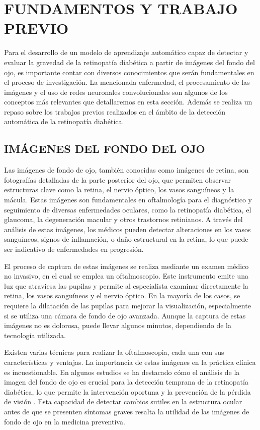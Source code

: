 \chapter{FUNDAMENTOS Y TRABAJO PREVIO}

Para el desarrollo de un modelo de aprendizaje automático capaz de detectar y evaluar la
gravedad de la retinopatía diabética a partir de imágenes del fondo del ojo, es importante
contar con diversos conocimientos que serán fundamentales en el proceso de investigación.
La mencionada enfermedad, el procesamiento de las imágenes y el uso de redes neuronales
convolucionales son algunos de los conceptos más relevantes que detallaremos en esta
sección. Además se realiza un repaso sobre los trabajos previos realizados en el ámbito de
la detección automática de la retinopatía diabética.

\section{IMÁGENES DEL FONDO DEL OJO}

Las imágenes de fondo de ojo, también conocidas como imágenes de retina, son fotografías
detalladas de la parte posterior del ojo, que permiten observar estructuras clave como la
retina, el nervio óptico, los vasos sanguíneos y la mácula. Estas imágenes son
fundamentales en oftalmología para el diagnóstico y seguimiento de diversas enfermedades
oculares, como la retinopatía diabética, el glaucoma, la degeneración macular y otros
trastornos retinianos. A través del análisis de estas imágenes, los médicos pueden
detectar alteraciones en los vasos sanguíneos, signos de inflamación, o daño estructural
en la retina, lo que puede ser indicativo de enfermedades en progresión.

El proceso de captura de estas imágenes se realiza mediante un examen médico no invasivo,
en el cual se emplea un oftalmoscopio. Este instrumento emite una luz que atraviesa las
pupilas y permite al especialista examinar directamente la retina, los vasos sanguíneos y
el nervio óptico. En la mayoría de los casos, se requiere la dilatación de las pupilas
para mejorar la visualización, especialmente si se utiliza una cámara de fondo de ojo
avanzada. Aunque la captura de estas imágenes no es dolorosa, puede llevar algunos
minutos, dependiendo de la tecnología utilizada.

Existen varias técnicas para realizar la oftalmoscopia, cada una con sus características y
ventajas. La importancia de estas imágenes en la práctica clínica es incuestionable. En
algunos estudios  se ha destacado cómo el análisis de la
imagen del fondo de ojo es crucial para la detección temprana de la retinopatía diabética,
lo que permite la intervención oportuna y la prevención de la pérdida de visión . Esta
capacidad de detectar cambios sutiles en la estructura ocular antes de que se presenten
síntomas graves resalta la utilidad de las imágenes de fondo de ojo en la medicina
preventiva.

